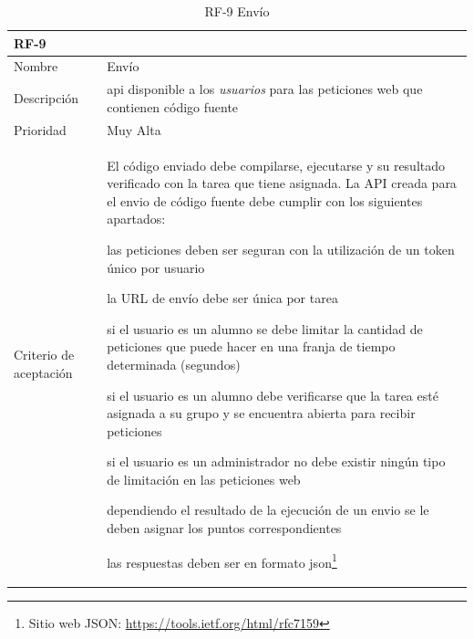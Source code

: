 \documentclass[11pt,spanish,listoffigures,listoftables]{tfgetsinf}
\begin{document}
\begin{table}[ht!]
	\centering
	\begin{tabular}{ |p{4cm}||p{10cm}|  }
		\multicolumn{2}{l}{\textbf{RF-9}} \\
		\hline
		Nombre   & Envío \\
		\hline
		Descripción  & \acrshort{api} disponible a los \textit{usuarios} para las peticiones web que contienen código fuente  \\
		\hline
		Prioridad &  Muy Alta\\
		\hline
		Criterio de aceptación & El código enviado debe compilarse, ejecutarse y su resultado verificado con la \gls{tarea} que tiene asignada.
		La API creada para el \gls{envio} de código fuente debe cumplir con los siguientes apartados: \newline
		\begin{tabitem}
			\item las peticiones deben ser seguran con la utilización de un token único por usuario
			\item la URL de envío debe ser única por \gls{tarea}
			\item si el usuario es un \gls{alumno} se debe limitar la cantidad de peticiones que puede hacer en una franja de tiempo determinada (segundos)
			\item si el usuario es un \gls{alumno} debe verificarse que la \gls{tarea} esté asignada a su \gls{grupo} y se encuentra abierta para recibir peticiones
			\item si el usuario es un \gls{administrador} no debe existir ningún tipo de limitación en las peticiones web
			\item dependiendo el resultado de la ejecución de un \gls{envio} se le deben asignar los puntos correspondientes
			\item las respuestas deben ser en formato \acrshort{json}\footnote{Sitio web JSON: \url{https://tools.ietf.org/html/rfc7159}}
		\end{tabitem} \\
		\hline
	\end{tabular}
	\caption{RF-9 Envío}
	\label{table:9}
\end{table}
\end{document}
